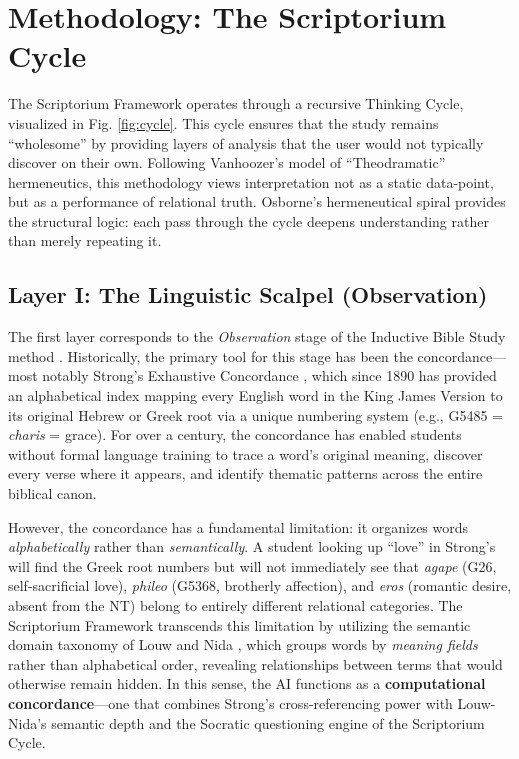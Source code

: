 \section{Methodology: The Scriptorium Cycle}
The Scriptorium Framework operates through a recursive Thinking Cycle, visualized in Fig. \ref{fig:cycle}. This cycle ensures that the study remains ``wholesome'' by providing layers of analysis that the user would not typically discover on their own. Following Vanhoozer's \cite{vanhoozer2005} model of ``Theodramatic'' hermeneutics, this methodology views interpretation not as a static data-point, but as a performance of relational truth. Osborne's \cite{osborne2006} hermeneutical spiral provides the structural logic: each pass through the cycle deepens understanding rather than merely repeating it.

\subsection{Layer I: The Linguistic Scalpel (Observation)}
The first layer corresponds to the \textit{Observation} stage of the Inductive Bible Study method \cite{traina1952,bauer2011}. Historically, the primary tool for this stage has been the concordance---most notably Strong's Exhaustive Concordance \cite{strong1890}, which since 1890 has provided an alphabetical index mapping every English word in the King James Version to its original Hebrew or Greek root via a unique numbering system (e.g., G5485 = \textit{charis} = grace). For over a century, the concordance has enabled students without formal language training to trace a word's original meaning, discover every verse where it appears, and identify thematic patterns across the entire biblical canon.

However, the concordance has a fundamental limitation: it organizes words \textit{alphabetically} rather than \textit{semantically}. A student looking up ``love'' in Strong's will find the Greek root numbers but will not immediately see that \textit{agape} (G26, self-sacrificial love), \textit{phileo} (G5368, brotherly affection), and \textit{eros} (romantic desire, absent from the NT) belong to entirely different relational categories. The Scriptorium Framework transcends this limitation by utilizing the semantic domain taxonomy of Louw and Nida \cite{louwnida1988}, which groups words by \textit{meaning fields} rather than alphabetical order, revealing relationships between terms that would otherwise remain hidden. In this sense, the AI functions as a \textbf{computational concordance}---one that combines Strong's cross-referencing power with Louw-Nida's semantic depth and the Socratic questioning engine of the Scriptorium Cycle.


